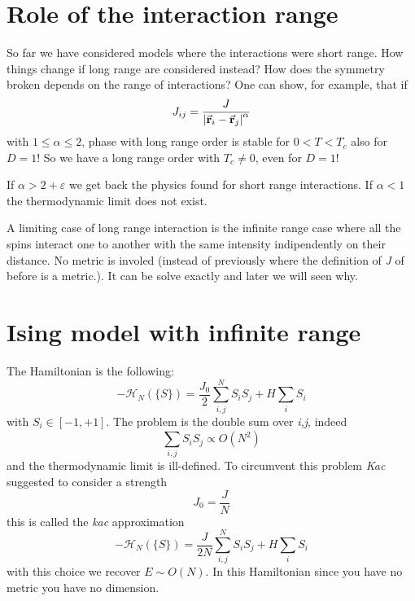 \documentclass[../main/main.tex]{subfiles}
\begin{document}
\section{Role of the interaction range}
So far we have considered models where the interactions were short range. How things change if long range are considered instead? How does the symmetry broken depends on the range of interactions? One can show, for example, that if
\begin{equation}
  J_{ij} = \frac{J}{\abs{\va{r}_i - \va{r}_j}^\alpha  }
\end{equation}
with \( 1 \le \alpha \le 2 \), phase with long range order is stable for \( 0 < T < T_c \) also for \( D=1 \)!   So we have a long range order with \( T_c \neq 0 \), even for \( D=1 \)!

\begin{remark}
If \( \alpha > 2 + \varepsilon  \) we get back the physics found for short range interactions. If \( \alpha <1 \) the thermodynamic limit does not exist.
\end{remark}
A limiting case of long range interaction is the infinite range case where all the spins interact one to another with the same intensity indipendently on their distance. No metric is involed (instead of previously where the definition of \emph{J} of before is a metric.). It can be solve exactly and later we will seen why.


\section{Ising model with infinite range}

The Hamiltonian is the following:
\begin{equation}
  -\mathcal{H}_N (\{ S \} ) = \frac{J_0}{2} \sum_{i,j}^{N} S_i S_j + H \sum_{i}^{}  S_i
\end{equation}
with \( S_i \in [-1,+1] \). The problem is the double sum over \emph{i,j}, indeed
\begin{equation}
  \sum_{i,j}^{} S_i S_j \propto O(N^2)
\end{equation}
and the thermodynamic limit is ill-defined. To circumvent this problem \emph{Kac}  suggested to consider a strength
\begin{equation}
  J_0 = \frac{J}{N}
\end{equation}
this is called the \emph{kac} approximation
\begin{equation}
  -\mathcal{H}_N (\{ S \} ) = \frac{J}{2N} \sum_{i,j}^{N} S_i S_j + H \sum_{i}^{}  S_i
\end{equation}
with this choice we recover \( E \sim O(N) \).  In this Hamiltonian since you have no metric you have no dimension.
\end{document}
